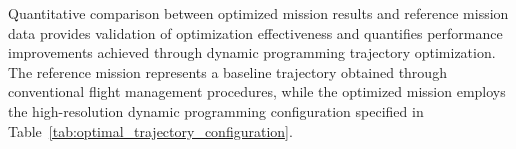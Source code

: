 Quantitative comparison between optimized mission results and reference mission data provides validation of optimization effectiveness and quantifies performance improvements achieved through dynamic programming trajectory optimization. The reference mission represents a baseline trajectory obtained through conventional flight management procedures, while the optimized mission employs the high-resolution dynamic programming configuration specified in Table~\ref{tab:optimal_trajectory_configuration}.
